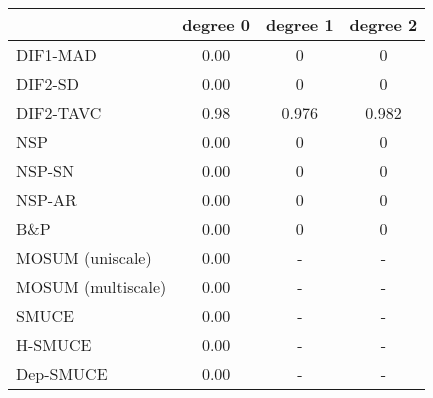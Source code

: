 \begin{tabular}{|l|c|c|c|}
  \hline
 & degree 0 & degree 1 & degree 2 \\ 
  \hline
DIF1-MAD & 0.00 & 0 & 0 \\ 
  DIF2-SD & 0.00 & 0 & 0 \\ 
  DIF2-TAVC & 0.98 & 0.976 & 0.982 \\ 
  NSP & 0.00 & 0 & 0 \\ 
  NSP-SN & 0.00 & 0 & 0 \\ 
  NSP-AR & 0.00 & 0 & 0 \\ 
  B\&P & 0.00 & 0 & 0 \\ 
  MOSUM (uniscale) & 0.00 & - & - \\ 
  MOSUM (multiscale) & 0.00 & - & - \\ 
  SMUCE & 0.00 & - & - \\ 
  H-SMUCE & 0.00 & - & - \\ 
  Dep-SMUCE & 0.00 & - & - \\ 
   \hline
\end{tabular}
